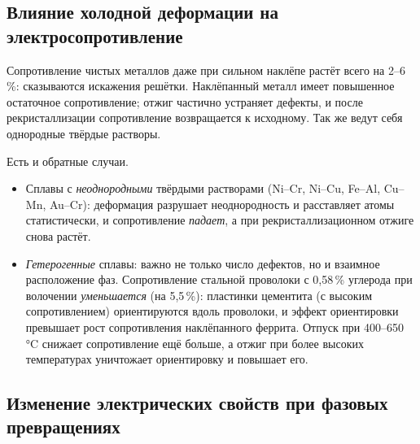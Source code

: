 \subsection{Влияние холодной деформации на электросопротивление}\label{ssec:rho-cold}

Сопротивление чистых металлов даже при сильном наклёпе растёт всего на
2--6\,\%: сказываются искажения решётки. Наклёпанный металл имеет
повышенное остаточное сопротивление; отжиг частично устраняет дефекты,
и после рекристаллизации сопротивление возвращается к исходному. Так
же ведут себя однородные твёрдые растворы.

Есть и обратные случаи.
\begin{itemize}
\item Сплавы с \emph{неоднородными} твёрдыми растворами (Ni--Cr, Ni--Cu,
Fe--Al, Cu--Mn, Au--Cr): деформация разрушает неоднородность и
расставляет атомы статистически, и сопротивление \emph{падает}, а при
рекристаллизационном отжиге снова растёт.
\item \emph{Гетерогенные} сплавы: важно не только число дефектов, но и
взаимное расположение фаз. Сопротивление стальной проволоки с 0,58\,\%
углерода при волочении \emph{уменьшается} (на 5,5\,\%): пластинки
цементита (с высоким сопротивлением) ориентируются вдоль проволоки, и
эффект ориентировки превышает рост сопротивления наклёпанного феррита.
Отпуск при 400--650\,°C снижает сопротивление ещё больше, а отжиг при
более высоких температурах уничтожает ориентировку и повышает его.
\end{itemize}

\subsection{Изменение электрических свойств при фазовых превращениях}\label{ssec:el-phase}

